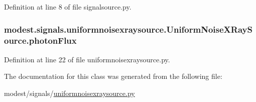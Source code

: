 Definition at line 8 of file signalsource.\+py.

\subsubsection[{\texorpdfstring{photon\+Flux}{photonFlux}}]{\setlength{\rightskip}{0pt plus 5cm}modest.\+signals.\+uniformnoisexraysource.\+Uniform\+Noise\+X\+Ray\+Source.\+photon\+Flux}\hypertarget{classmodest_1_1signals_1_1uniformnoisexraysource_1_1UniformNoiseXRaySource_a0f958a631c21f5e56d09e1906a50aa18}{}\label{classmodest_1_1signals_1_1uniformnoisexraysource_1_1UniformNoiseXRaySource_a0f958a631c21f5e56d09e1906a50aa18}


Definition at line 22 of file uniformnoisexraysource.\+py.



The documentation for this class was generated from the following file\+:\begin{DoxyCompactItemize}
\item 
modest/signals/\hyperlink{uniformnoisexraysource_8py}{uniformnoisexraysource.\+py}\end{DoxyCompactItemize}
